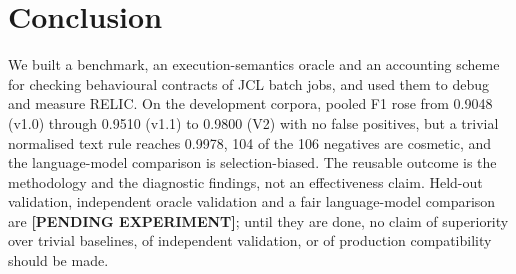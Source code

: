 \section{Conclusion}
\label{sec:conclusion}

We built a benchmark, an execution-semantics oracle and an accounting scheme for
checking behavioural contracts of JCL batch jobs, and used them to debug and
measure RELIC. On the development corpora, pooled F1 rose from 0.9048 (v1.0)
through 0.9510 (v1.1) to 0.9800 (V2) with no false positives, but a trivial
normalised text rule reaches 0.9978, 104 of the 106 negatives are cosmetic, and
the language-model comparison is selection-biased. The reusable outcome is the
methodology and the diagnostic findings, not an effectiveness claim.
Held-out validation, independent oracle validation and a fair language-model
comparison are \textbf{[PENDING EXPERIMENT]}; until they are done, no claim of
superiority over trivial baselines, of independent validation, or of production
compatibility should be made.
